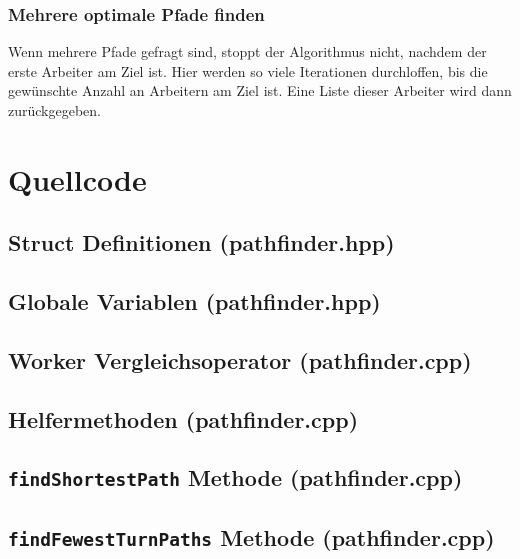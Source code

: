 \documentclass[a4paper,10pt,ngerman]{scrartcl}
\begin{document}
\subsubsection{Mehrere optimale Pfade finden}
Wenn mehrere Pfade gefragt sind, stoppt der Algorithmus nicht, nachdem der erste Arbeiter am Ziel ist. Hier werden so viele Iterationen durchloffen, bis die gewünschte
Anzahl an Arbeitern am Ziel ist. Eine Liste dieser Arbeiter wird dann zurückgegeben.

\newpage

\section{Quellcode}
\subsection{Struct Definitionen (pathfinder.hpp)}


\subsection{Globale Variablen (pathfinder.hpp)}


\subsection{Worker Vergleichsoperator (pathfinder.cpp)}


\subsection{Helfermethoden (pathfinder.cpp)}


\subsection{\texttt{findShortestPath} Methode (pathfinder.cpp)}


\subsection{\texttt{findFewestTurnPaths} Methode (pathfinder.cpp)}

\end{document}
